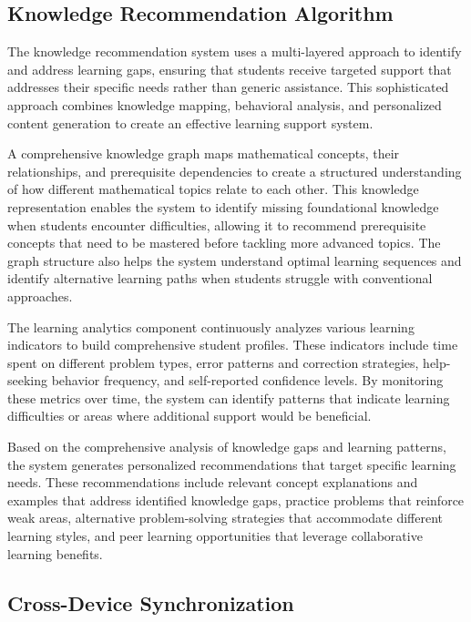 \documentclass[conference]{IEEEtran}
\begin{document}
\begin{IEEEkeywords}
\subsection{Knowledge Recommendation Algorithm}

The knowledge recommendation system uses a multi-layered approach to identify and address learning gaps, ensuring that students receive targeted support that addresses their specific needs rather than generic assistance. This sophisticated approach combines knowledge mapping, behavioral analysis, and personalized content generation to create an effective learning support system.

A comprehensive knowledge graph maps mathematical concepts, their relationships, and prerequisite dependencies to create a structured understanding of how different mathematical topics relate to each other. This knowledge representation enables the system to identify missing foundational knowledge when students encounter difficulties, allowing it to recommend prerequisite concepts that need to be mastered before tackling more advanced topics. The graph structure also helps the system understand optimal learning sequences and identify alternative learning paths when students struggle with conventional approaches.

The learning analytics component continuously analyzes various learning indicators to build comprehensive student profiles. These indicators include time spent on different problem types, error patterns and correction strategies, help-seeking behavior frequency, and self-reported confidence levels. By monitoring these metrics over time, the system can identify patterns that indicate learning difficulties or areas where additional support would be beneficial.

Based on the comprehensive analysis of knowledge gaps and learning patterns, the system generates personalized recommendations that target specific learning needs. These recommendations include relevant concept explanations and examples that address identified knowledge gaps, practice problems that reinforce weak areas, alternative problem-solving strategies that accommodate different learning styles, and peer learning opportunities that leverage collaborative learning benefits.

\subsection{Cross-Device Synchronization}


\end{IEEEkeywords}
\end{document}
